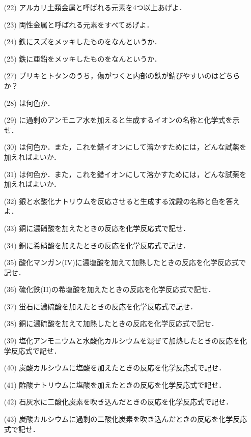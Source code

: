 \documentclass[a4paper,twocolumn,11pt]{ltjsarticle}
\begin{document}
\begin{itemize}
\item[(22)]アルカリ土類金属と呼ばれる元素を4つ以上あげよ．\\[2cm]
\item[(23)]両性金属と呼ばれる元素をすべてあげよ．\\[2cm]
\item[(24)]鉄にスズをメッキしたものをなんというか．\\[2cm]
\item[(25)]鉄に亜鉛をメッキしたものをなんというか．\\  [2cm]
\item[(27)]ブリキとトタンのうち，傷がつくと内部の鉄が錆びやすいのはどちらか？\\[2cm]
\item[(28)]は何色か．\newpage
\item[(29)]  に過剰のアンモニア水を加えると生成するイオンの名称と化学式を示せ．\\[3cm]
\item[(30)]は何色か．また，これを錯イオンにして溶かすためには，どんな試薬を加えればよいか．\\[2cm]
\item[(31)]は何色か．また，これを錯イオンにして溶かすためには，どんな試薬を加えればよいか．\\[2cm]
\item[(32)]銀と水酸化ナトリウムを反応させると生成する沈殿の名称と色を答えよ．\\[2cm]
\item[(33)]銅に濃硝酸を加えたときの反応を化学反応式で記せ．\\[2cm]
\newpage 
\item[(34)]銅に希硝酸を加えたときの反応を化学反応式で記せ．\\[2cm]
\item[(35)]酸化マンガン(IV)に濃塩酸を加えて加熱したときの反応を化学反応式で記せ．\\[2cm]
\item[(36)]硫化鉄(II)の希塩酸を加えたときの反応を化学反応式で記せ．\\[2cm]
\item[(37)]蛍石に濃硫酸を加えたときの反応を化学反応式で記せ．\\[2cm]
\item[(38)]銅に濃硫酸を加えて加熱したときの反応を化学反応式で記せ．\\[2cm]
\newpage
\item[(39)] 塩化アンモニウムと水酸化カルシウムを混ぜて加熱したときの反応を化学反応式で記せ．\\[2cm]
\item[(40)]炭酸カルシウムに塩酸を加えたときの反応を化学反応式で記せ．\\[2cm]
\item[(41)]酢酸ナトリウムに塩酸を加えたときの反応を化学反応式で記せ．\\[2cm]       
 \item[(42)]石灰水に二酸化炭素を吹き込んだときの反応を化学反応式で記せ．\\[2cm]
 \item[(43)]炭酸カルシウムに過剰の二酸化炭素を吹き込んだときの反応を化学反応式で記せ．      
    \end{itemize}
\end{document}

